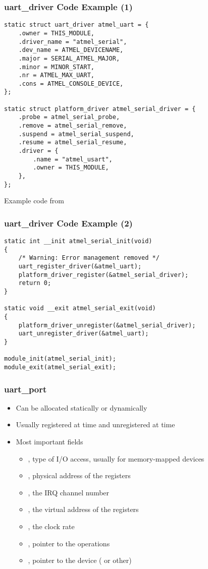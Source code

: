 \begin{frame}[fragile]
  \frametitle{uart\_driver Code Example (1)}
\begin{verbatim}
static struct uart_driver atmel_uart = {
    .owner = THIS_MODULE,
    .driver_name = "atmel_serial",
    .dev_name = ATMEL_DEVICENAME,
    .major = SERIAL_ATMEL_MAJOR,
    .minor = MINOR_START,
    .nr = ATMEL_MAX_UART,
    .cons = ATMEL_CONSOLE_DEVICE,
};

static struct platform_driver atmel_serial_driver = {
    .probe = atmel_serial_probe,
    .remove = atmel_serial_remove,
    .suspend = atmel_serial_suspend,
    .resume = atmel_serial_resume,
    .driver = {
        .name = "atmel_usart",
        .owner = THIS_MODULE,
    },
};
\end{verbatim}
Example code from 
\end{frame}

\begin{frame}[fragile]
  \frametitle{uart\_driver Code Example (2)}
\begin{verbatim}
static int __init atmel_serial_init(void)
{
    /* Warning: Error management removed */
    uart_register_driver(&atmel_uart);
    platform_driver_register(&atmel_serial_driver);
    return 0;
}

static void __exit atmel_serial_exit(void)
{
    platform_driver_unregister(&atmel_serial_driver);
    uart_unregister_driver(&atmel_uart);
}

module_init(atmel_serial_init);
module_exit(atmel_serial_exit);
\end{verbatim}
\end{frame}

\begin{frame}
  \frametitle{uart\_port}
  \begin{itemize}
  \item Can be allocated statically or dynamically
  \item Usually registered at  time and unregistered at
     time
  \item Most important fields
    \begin{itemize}
    \item {}, type of I/O access, usually 
      for memory-mapped devices
    \item {}, physical address of the registers
    \item {}, the IRQ channel number
    \item {}, the virtual address of the registers
    \item {}, the clock rate
    \item {}, pointer to the operations
    \item {}, pointer to the device (
      or other)
    \end{itemize}
  \end{itemize}
\end{frame}

